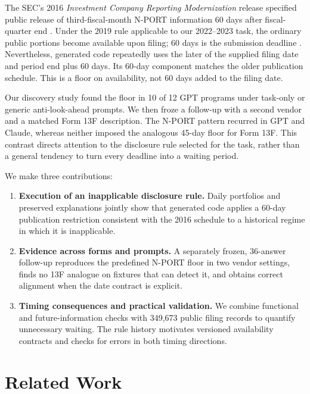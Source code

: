 \documentclass[10pt,twocolumn,a4paper]{article}
\begin{document}
The SEC's 2016 \emph{Investment Company Reporting Modernization} release specified public release of third-fiscal-month N-PORT information 60 days after fiscal-quarter end \citep[pp.\ 17, 152; General Instruction F, p.\ 584]{sec2016}. Under the 2019 rule applicable to our 2022--2023 task, the ordinary public portions become available upon filing; 60 days is the submission deadline \citep[p.\ 8]{sec2019}. Nevertheless, generated code repeatedly uses the later of the supplied filing date and period end plus 60 days. Its 60-day component matches the older publication schedule. This is a floor on availability, not 60 days added to the filing date.

Our discovery study found the floor in 10 of 12 GPT programs under task-only or generic anti-look-ahead prompts. We then froze a follow-up with a second vendor and a matched Form 13F description. The N-PORT pattern recurred in GPT and Claude, whereas neither imposed the analogous 45-day floor for Form 13F. This contrast directs attention to the disclosure rule selected for the task, rather than a general tendency to turn every deadline into a waiting period.

We make three contributions:
\begin{enumerate}\setlength{\itemsep}{2pt}\setlength{\parsep}{0pt}
\item \textbf{Execution of an inapplicable disclosure rule.} Daily portfolios and preserved explanations jointly show that generated code applies a 60-day publication restriction consistent with the 2016 schedule to a historical regime in which it is inapplicable.
\item \textbf{Evidence across forms and prompts.} A separately frozen, 36-answer follow-up reproduces the predefined N-PORT floor in two vendor settings, finds no 13F analogue on fixtures that can detect it, and obtains correct alignment when the date contract is explicit.
\item \textbf{Timing consequences and practical validation.} We combine functional and future-information checks with 349,673 public filing records to quantify unnecessary waiting. The rule history motivates versioned availability contracts and checks for errors in both timing directions.
\end{enumerate}

\section{Related Work}
\end{document}
